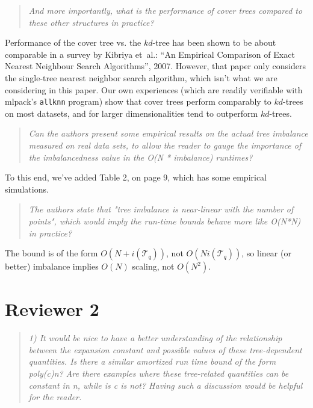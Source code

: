 \documentclass[twoside,11pt]{article}
\begin{document}
\begin{quote}{\it
And more importantly, what is the performance of cover trees compared to these
other structures in practice?
}\end{quote}

Performance of the cover tree vs. the $kd$-tree has been shown to be about
comparable in a survey by Kibriya et~al.: ``An Empirical Comparison of Exact
Nearest Neighbour Search Algorithms'', 2007.  However, that paper only considers
the single-tree nearest neighbor search algorithm, which isn't what we are
considering in this paper.  Our own experiences (which are readily verifiable
with mlpack's {\tt allknn} program) show that cover trees perform comparably to
$kd$-trees on most datasets, and for larger dimensionalities tend to outperform
$kd$-trees.

\begin{quote}{\it
Can the authors present some empirical results on the actual tree imbalance
measured on real data sets, to allow the reader to gauge the importance of the
imbalancedness value in the O(N * imbalance) runtimes?
}\end{quote}

To this end, we've added Table 2, on page 9, which has some empirical
simulations.

\begin{quote}{\it
The authors state that "tree imbalance is near-linear with the number of
points", which would imply the run-time bounds behave more like O(N*N) in
practice?
}\end{quote}

The bound is of the form $O(N + i(\mathscr{T}_q))$, not $O(N i(\mathscr{T}_q))$,
so linear (or better) imbalance implies $O(N)$ scaling, not $O(N^2)$.

\section{Reviewer 2}

\begin{quote}{\it
1) It would be nice to have a better understanding of the relationship between
the expansion constant and possible values of these tree-dependent quantities.
Is there a similar amortized run time bound of the form poly(c)n?  Are there
examples where these tree-related quantities can be constant in n, while is c is
not?  Having such a discussion would be helpful for the reader.
}\end{quote}
\end{document}
